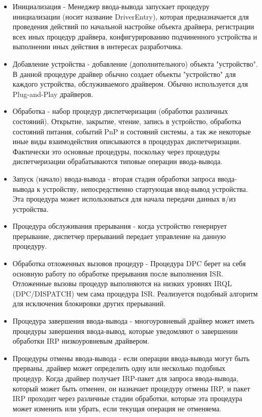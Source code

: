 \documentclass[14pt,a4paper]{article}
\begin{document}
\begin{itemize}
\item   Инициализация - Менеджер ввода-вывода запускает процедуру инициализации (носит название         DriverEntry), которая предназначается для проведения действий по начальной настройке объекта драйвера, регистрации всех иных процедур драйвера, конфигурированию подчиненного устройства и выполнении иных действия в интересах разработчика.
\item Добавление устройства - добавление (дополнительного) объекта "устройство". В данной процедуре драйвер обычно создает объекты "устройство" для каждого устройства, обслуживаемого драйвером. Обычно используется для Plug-and-Play драйверов.
\item Обработка - набор процедур диспетчеризации (обработки различных состояний). Открытие, закрытие, чтение, запись в устройство, обработка состояний питания, событий PnP и состояний системы, а так же некоторые иные виды взаимодействия описываются в процедурах диспетчеризации. Фактически это основные процедуры, поскольку через процедуры диспетчеризации обрабатываются типовые операции ввода-вывода.
\item Запуск (начало) ввода-вывода - вторая стадия обработки запроса ввода-вывода к устройству, непосредственно стартующая ввод-вывод устройства. Эта процедура может использоваться для начала передачи данных в/из устройства.
\item Процедура обслуживания прерывания - когда устройство генерирует прерывание, диспетчер прерываний передает управление на данную процедуру.
\item Обработка отложенных вызовов процедур - Процедура DPC берет на себя основную работу по обработке прерывания после выполнения ISR. Отложенные вызовы процедур выполняются на низких уровнях IRQL (DPC/DISPATCH) чем сама процедура ISR. Реализуется подобный алгоритм для исключения блокировки других прерываний.
\item Процедура завершения ввода-вывода - многоуровневый драйвер может иметь процедуры завершения ввода-вывод, которые уведомляют о завершении обработки IRP низкоуровневым драйвером.
\item Процедуры отмены ввода-вывода - если операции ввода-вывода могут быть прерваны, драйвер может определить одну или несколько подобных процедур. Когда драйвер получает IRP-пакет для запроса ввода-вывода, который может быть отменен, он назначает процедуру отмены IRP, и пакет IRP проходит через различные стадии обработки, которые эта процедура может изменить или убрать, если текущая операция не отменяема.

\end{itemize}
\end{document}
